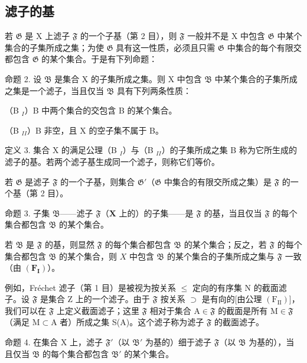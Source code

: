 \subsection{滤子的基}

若 \(\mathfrak{G}\) 是 X 上滤子 \(\mathfrak{F}\) 的一个子基（第 2 目），则 \(\mathfrak{F}\) 一般并不是 X 中包含 \(\mathfrak{G}\) 中某个集合的子集所成之集；为使 \(\mathfrak{G}\) 具有这一性质，必须且只需 \(\mathfrak{G}\) 中集合的每个有限交都包含 \(\mathfrak{G}\) 的某个集合。于是有下列命题：

命题 2. 设 \(\mathfrak{B}\) 是集合 X 的子集所成之集。则 X 中包含 \(\mathfrak{B}\) 中某个集合的子集所成之集是一个滤子，当且仅当 \(\mathfrak{B}\) 具有下列两条性质：

（B \(_{I}\)）B 中两个集合的交包含 B 的某个集合。

（B \(_{II}\)）B 非空，且 X 的空子集不属于 B。

定义 3. 集合 X 的满足公理（B \(_{I}\)）与（B \(_{II}\)）的子集所成之集 B 称为它所生成的滤子的基。若两个滤子基生成同一个滤子，则称它们等价。

若 \(\mathfrak{G}\) 是滤子 \(\mathfrak{F}\) 的一个子基，则集合 \(\mathfrak{G}'\)（\(\mathfrak{G}\) 中集合的有限交所成之集）是 \(\mathfrak{F}\) 的一个基（第 2 目）。

命题 3. 子集 \(\mathfrak{B}\)——滤子 \(\mathfrak{F}\)（\(\mathbf{X}\) 上的）的子集——是 \(\mathfrak{F}\) 的基，当且仅当 \(\mathfrak{F}\) 的每个集合都包含 \(\mathfrak{B}\) 的某个集合。

若 \(\mathfrak{B}\) 是 \(\mathfrak{F}\) 的基，则显然 \(\mathfrak{F}\) 的每个集合都包含 \(\mathfrak{B}\) 的某个集合；反之，若 \(\mathfrak{F}\) 的每个集合都包含 \(\mathfrak{B}\) 的某个集合，则 \(X\) 中包含 \(\mathfrak{B}\) 的某个集合的子集所成之集与 \(\mathfrak{F}\) 一致（由 \((\mathbf{F}_{\mathbf{I}})\)）。

例如，Fréchet 滤子（第 1 目）是被视为按关系 \(\leqslant\) 定向的有序集 N 的截面滤子。设 \(\mathfrak{F}\) 是集合 Z 上的一个滤子。由于 \(\mathfrak{F}\) 按关系 \(\supset\) 是有向的{[}由公理 \((\mathrm{F}_{\mathrm{II}})\){]}，我们可以在 \(\mathfrak{F}\) 上定义截面滤子；这里 \(\mathfrak{F}\) 相对于集合 A\(\in\mathfrak{F}\) 的截面是所有 M\(\in\mathfrak{F}\)（满足 M\(\subset\)A 者）所成之集 S(A)。这个滤子称为滤子 \(\mathfrak{F}\) 的截面滤子。

命题 4. 在集合 X 上，滤子 \(\mathfrak{F}'\)（以 \(\mathfrak{B}'\) 为基的）细于滤子 \(\mathfrak{F}\)（以 \(\mathfrak{B}\) 为基的），当且仅当 \(\mathfrak{B}\) 的每个集合都包含 \(\mathfrak{B}'\) 的某个集合。

